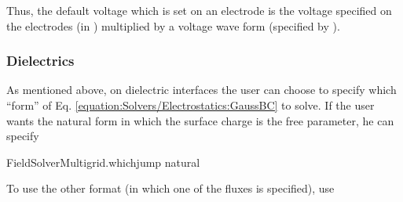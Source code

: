 \documentclass[letterpaper,10pt,english]{sphinxmanual}
\begin{document}
\begin{sphinxVerbatim}[commandchars=\\\{\},formatcom=\scriptsize]
 
 
   

   \PYG{p}{[}\PYG{p}{]}       
      

 
\end{sphinxVerbatim}

Thus, the default voltage which is set on an electrode is the voltage  specified on the electrodes (in ) multiplied by a voltage wave form (specified by ).


\subsubsection{Dielectrics}
\label{\detokenize{Solvers/Electrostatics:dielectrics}}\label{\detokenize{Solvers/Electrostatics:chap-poissondielectricbc}}
As mentioned above, on dielectric interfaces the user can choose to specify which “form” of Eq. \ref{equation:Solvers/Electrostatics:GaussBC} to solve.
If the user wants the natural form in which the surface charge is the free parameter, he can specify

\begin{sphinxVerbatim}[commandchars=\\\{\},formatcom=\scriptsize]
FieldSolverMultigrid.which\PYGZus{}jump  natural
\end{sphinxVerbatim}

To use the other format (in which one of the fluxes is specified), use
\end{document}

